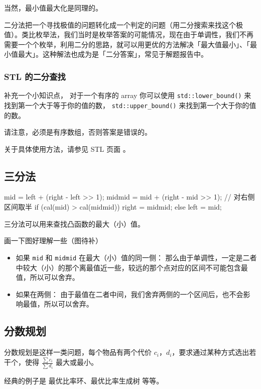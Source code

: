 当然，最小值最大化是同理的。

二分法把一个寻找极值的问题转化成一个判定的问题（用二分搜索来找这个极值）。类比枚举法，我们当时是枚举答案的可能情况，现在由于单调性，我们不再需要一个个枚举，利用二分的思路，就可以用更优的方法解决「最大值最小」、「最小值最大」。这种解法也成为是「二分答案」，常见于解题报告中。

\subsubsection{STL 的二分查找}

补充一个小知识点， 对于一个有序的 array 你可以使用 \texttt{std::lower\_bound()} 来找到第一个大于等于你的值的数， \texttt{std::upper\_bound()} 来找到第一个大于你的值的数。

请注意，必须是有序数组，否则答案是错误的。

关于具体使用方法，请参见  STL 页面 。

\subsection{三分法}

\begin{cppcode}
mid = left + (right - left >> 1);
midmid = mid + (right - mid >> 1);  // 对右侧区间取半
if (cal(mid) > cal(midmid))
  right = midmid;
else
  left = mid;
\end{cppcode}

三分法可以用来查找凸函数的最大（小）值。

画一下图好理解一些（图待补）

\begin{itemize}
\item 如果 \texttt{mid} 和 \texttt{midmid} 在最大（小）值的同一侧：
那么由于单调性，一定是二者中较大（小）的那个离最值近一些，较远的那个点对应的区间不可能包含最值，所以可以舍弃。
\item 如果在两侧：
由于最值在二者中间，我们舍弃两侧的一个区间后，也不会影响最值，所以可以舍弃。
\end{itemize}

\subsection{分数规划}

分数规划是这样一类问题，每个物品有两个代价 $c_i$，$d_i$，要求通过某种方式选出若干个，使得 $\frac{\sum{c_i}}{\sum{d_i}}$ 最大或最小。

经典的例子是 最优比率环、最优比率生成树 等等。

